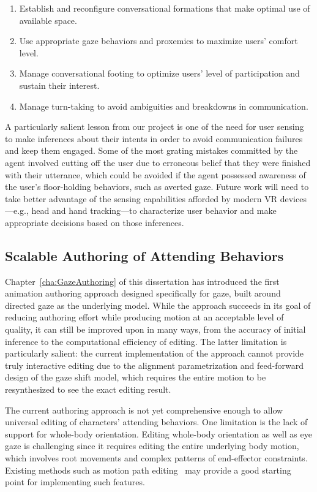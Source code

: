 \begin{enumerate}
\item Establish and reconfigure conversational formations that make optimal use of available space.
\item Use appropriate gaze behaviors and proxemics to maximize users' comfort level.
\item Manage conversational footing to optimize users' level of participation and sustain their interest.
\item Manage turn-taking to avoid ambiguities and breakdowns in communication.
\end{enumerate}

A particularly salient lesson from our project is one of the need for user sensing to make inferences about their intents in order to avoid communication failures and keep them engaged. Some of the most grating mistakes committed by the agent involved cutting off the user due to erroneous belief that they were finished with their utterance, which could be avoided if the agent possessed awareness of the user's floor-holding behaviors, such as averted gaze. Future work will need to take better advantage of the sensing capabilities afforded by modern VR devices---e.g., head and hand tracking---to characterize user behavior and make appropriate decisions based on those inferences.

\subsection{Scalable Authoring of Attending Behaviors}

Chapter~\ref{cha:GazeAuthoring} of this dissertation has introduced the first animation authoring approach designed specifically for gaze, built around directed gaze as the underlying model. While the approach succeeds in its goal of reducing authoring effort while producing motion at an acceptable level of quality, it can still be improved upon in many ways, from the accuracy of initial inference to the computational efficiency of editing. The latter limitation is particularly salient: the current implementation of the approach cannot provide truly interactive editing due to the alignment parametrization and feed-forward design of the gaze shift model, which requires the entire motion to be resynthesized to see the exact editing result.

The current authoring approach is not yet comprehensive enough to allow universal editing of characters' attending behaviors. One limitation is the lack of support for whole-body orientation. Editing whole-body orientation as well as eye gaze is challenging since it requires editing the entire underlying body motion, which involves root movements and complex patterns of end-effector constraints. Existing methods such as motion path editing~\citep{gleicher2001path} may provide a good starting point for implementing such features.

